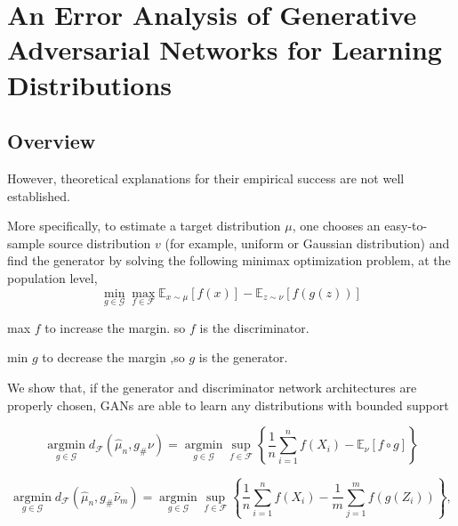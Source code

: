 
\chapter{An Error Analysis of Generative Adversarial Networks for
Learning Distributions}
\section*{Overview}



However, theoretical explanations for
their empirical success are not well established.

More specifically,
to estimate a target distribution $\mu$, one chooses an easy-to-sample source distribution $v$ (for
example, uniform or Gaussian distribution) and find the generator by solving the following
minimax optimization problem, at the population level,
$$
\min _{g \in \mathcal{G}} \max _{f \in \mathcal{F}} \mathbb{E}_{x \sim \mu}[f(x)]-\mathbb{E}_{z \sim \nu}[f(g(z))]$$


max $f$ to increase the margin. so $f$ is the discriminator.

min $g$ to decrease the margin ,so $g$ is the generator.


We show that, if the generator and discriminator network architectures
are properly chosen, GANs are able to learn any distributions with bounded support

$$
\underset{g \in \mathcal{G}}{\operatorname{argmin}} d_{\mathcal{F}}\left(\widehat{\mu}_n, g_{\#} \nu\right)=\underset{g \in \mathcal{G}}{\operatorname{argmin}} \sup _{f \in \mathcal{F}}\left\{\frac{1}{n} \sum_{i=1}^n f\left(X_i\right)-\mathbb{E}_\nu[f \circ g]\right\}
$$

$$
\underset{g \in \mathcal{G}}{\operatorname{argmin}} d_{\mathcal{F}}\left(\widehat{\mu}_n, g_{\#} \widehat{\nu}_m\right)=\underset{g \in \mathcal{G}}{\operatorname{argmin}} \sup _{f \in \mathcal{F}}\left\{\frac{1}{n} \sum_{i=1}^n f\left(X_i\right)-\frac{1}{m} \sum_{j=1}^m f\left(g\left(Z_i\right)\right)\right\},
$$


